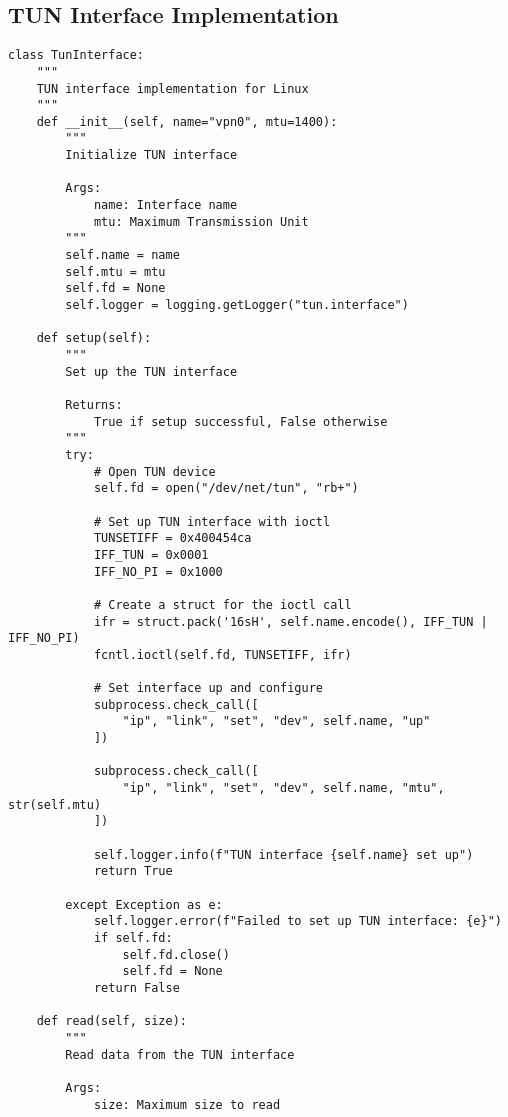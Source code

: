 \documentclass[12pt,a4paper]{report}
\begin{document}
\subsection{TUN Interface Implementation}
\begin{lstlisting}[style=python, caption=Linux TUN Interface Implementation]
class TunInterface:
    """
    TUN interface implementation for Linux
    """
    def __init__(self, name="vpn0", mtu=1400):
        """
        Initialize TUN interface
        
        Args:
            name: Interface name
            mtu: Maximum Transmission Unit
        """
        self.name = name
        self.mtu = mtu
        self.fd = None
        self.logger = logging.getLogger("tun.interface")
        
    def setup(self):
        """
        Set up the TUN interface
        
        Returns:
            True if setup successful, False otherwise
        """
        try:
            # Open TUN device
            self.fd = open("/dev/net/tun", "rb+")
            
            # Set up TUN interface with ioctl
            TUNSETIFF = 0x400454ca
            IFF_TUN = 0x0001
            IFF_NO_PI = 0x1000
            
            # Create a struct for the ioctl call
            ifr = struct.pack('16sH', self.name.encode(), IFF_TUN | IFF_NO_PI)
            fcntl.ioctl(self.fd, TUNSETIFF, ifr)
            
            # Set interface up and configure
            subprocess.check_call([
                "ip", "link", "set", "dev", self.name, "up"
            ])
            
            subprocess.check_call([
                "ip", "link", "set", "dev", self.name, "mtu", str(self.mtu)
            ])
            
            self.logger.info(f"TUN interface {self.name} set up")
            return True
            
        except Exception as e:
            self.logger.error(f"Failed to set up TUN interface: {e}")
            if self.fd:
                self.fd.close()
                self.fd = None
            return False
            
    def read(self, size):
        """
        Read data from the TUN interface
        
        Args:
            size: Maximum size to read
            

\end{lstlisting}
\end{document}
